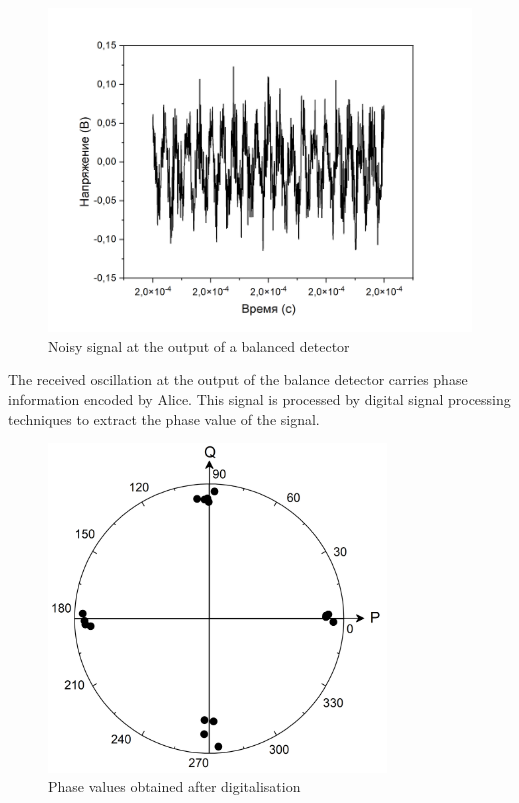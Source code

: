 {\begin{figure}
    \centering
    \includegraphics[width=\textwidth]{images/03.png}
    \caption{Noisy signal at the output of a balanced detector}
    \label{fig:noisy output inject syn}
\end{figure}
The received oscillation at the output of the balance detector carries phase information encoded by Alice. This signal is processed by digital signal processing techniques to extract the phase value of the signal. 
\begin{figure}
    \centering
    \includegraphics[width=0.8\textwidth]{images/06.png}
    \caption{Phase values obtained after digitalisation}
    \label{fig:phase meas ijnect syn}
\end{figure}

}
